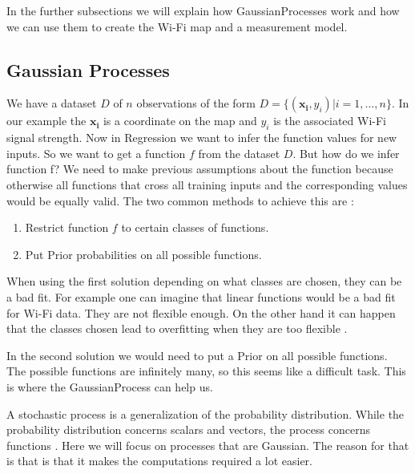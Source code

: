 In the further subsections we will explain how \Gls{GaussianProcess}es work and how we can use them to create the Wi-Fi map and a measurement model.

\subsection{Gaussian Processes}\label{sec:gp_basics}
We have a dataset $D$ of $n$ observations of the form $D=\{(\mathbf{x_i},y_i)|i = 1,...,n\}$. In our example the $\mathbf{x_i}$ is a coordinate on the map and $y_i$ is the associated Wi-Fi signal strength. Now in \gls{Regression} we want to infer the function values for new inputs. So we want to get a function $f$ from the dataset $D$. 
But how do we infer function f? We need to make previous assumptions about the function because otherwise all functions that cross all training inputs and the corresponding values would be equally valid. The two common methods to achieve this are \citep[p.\ 2]{Rasmussen:2005:GPM:1162254}:
\begin{enumerate}
	\setlength\itemsep{0 em}
	\item Restrict function $f$ to certain classes of functions.
	\item Put \gls{Prior} probabilities on all possible functions.
\end{enumerate}
When using the first solution depending on what classes are chosen, they can be a bad fit. For example one can imagine that linear functions would be a bad fit for Wi-Fi data. They are not flexible enough. On the other hand it can happen that the classes chosen lead to overfitting when they are too flexible \citep[p.\ 2]{Rasmussen:2005:GPM:1162254}.

In the second solution we would need to put a \gls{Prior} on all possible functions. The possible functions are infinitely many, so this seems like a difficult task. This is where the \Gls{GaussianProcess} can help us. 

A stochastic process is a generalization of the probability distribution. While the probability distribution concerns scalars and vectors, the process concerns functions \citep[p.\ 2]{Rasmussen:2005:GPM:1162254}. Here we will focus on processes that are Gaussian. The reason for that is that is that it makes the computations required a lot easier.
 

